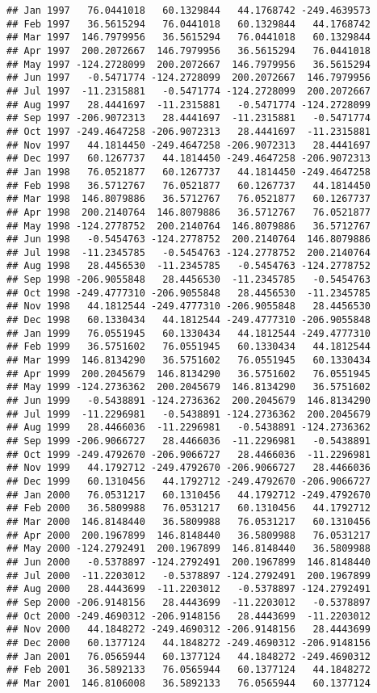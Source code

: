 \documentclass[]{article}
\begin{document}
\begin{verbatim}
## Jan 1997   76.0441018   60.1329844   44.1768742 -249.4639573
## Feb 1997   36.5615294   76.0441018   60.1329844   44.1768742
## Mar 1997  146.7979956   36.5615294   76.0441018   60.1329844
## Apr 1997  200.2072667  146.7979956   36.5615294   76.0441018
## May 1997 -124.2728099  200.2072667  146.7979956   36.5615294
## Jun 1997   -0.5471774 -124.2728099  200.2072667  146.7979956
## Jul 1997  -11.2315881   -0.5471774 -124.2728099  200.2072667
## Aug 1997   28.4441697  -11.2315881   -0.5471774 -124.2728099
## Sep 1997 -206.9072313   28.4441697  -11.2315881   -0.5471774
## Oct 1997 -249.4647258 -206.9072313   28.4441697  -11.2315881
## Nov 1997   44.1814450 -249.4647258 -206.9072313   28.4441697
## Dec 1997   60.1267737   44.1814450 -249.4647258 -206.9072313
## Jan 1998   76.0521877   60.1267737   44.1814450 -249.4647258
## Feb 1998   36.5712767   76.0521877   60.1267737   44.1814450
## Mar 1998  146.8079886   36.5712767   76.0521877   60.1267737
## Apr 1998  200.2140764  146.8079886   36.5712767   76.0521877
## May 1998 -124.2778752  200.2140764  146.8079886   36.5712767
## Jun 1998   -0.5454763 -124.2778752  200.2140764  146.8079886
## Jul 1998  -11.2345785   -0.5454763 -124.2778752  200.2140764
## Aug 1998   28.4456530  -11.2345785   -0.5454763 -124.2778752
## Sep 1998 -206.9055848   28.4456530  -11.2345785   -0.5454763
## Oct 1998 -249.4777310 -206.9055848   28.4456530  -11.2345785
## Nov 1998   44.1812544 -249.4777310 -206.9055848   28.4456530
## Dec 1998   60.1330434   44.1812544 -249.4777310 -206.9055848
## Jan 1999   76.0551945   60.1330434   44.1812544 -249.4777310
## Feb 1999   36.5751602   76.0551945   60.1330434   44.1812544
## Mar 1999  146.8134290   36.5751602   76.0551945   60.1330434
## Apr 1999  200.2045679  146.8134290   36.5751602   76.0551945
## May 1999 -124.2736362  200.2045679  146.8134290   36.5751602
## Jun 1999   -0.5438891 -124.2736362  200.2045679  146.8134290
## Jul 1999  -11.2296981   -0.5438891 -124.2736362  200.2045679
## Aug 1999   28.4466036  -11.2296981   -0.5438891 -124.2736362
## Sep 1999 -206.9066727   28.4466036  -11.2296981   -0.5438891
## Oct 1999 -249.4792670 -206.9066727   28.4466036  -11.2296981
## Nov 1999   44.1792712 -249.4792670 -206.9066727   28.4466036
## Dec 1999   60.1310456   44.1792712 -249.4792670 -206.9066727
## Jan 2000   76.0531217   60.1310456   44.1792712 -249.4792670
## Feb 2000   36.5809988   76.0531217   60.1310456   44.1792712
## Mar 2000  146.8148440   36.5809988   76.0531217   60.1310456
## Apr 2000  200.1967899  146.8148440   36.5809988   76.0531217
## May 2000 -124.2792491  200.1967899  146.8148440   36.5809988
## Jun 2000   -0.5378897 -124.2792491  200.1967899  146.8148440
## Jul 2000  -11.2203012   -0.5378897 -124.2792491  200.1967899
## Aug 2000   28.4443699  -11.2203012   -0.5378897 -124.2792491
## Sep 2000 -206.9148156   28.4443699  -11.2203012   -0.5378897
## Oct 2000 -249.4690312 -206.9148156   28.4443699  -11.2203012
## Nov 2000   44.1848272 -249.4690312 -206.9148156   28.4443699
## Dec 2000   60.1377124   44.1848272 -249.4690312 -206.9148156
## Jan 2001   76.0565944   60.1377124   44.1848272 -249.4690312
## Feb 2001   36.5892133   76.0565944   60.1377124   44.1848272
## Mar 2001  146.8106008   36.5892133   76.0565944   60.1377124
\end{verbatim}
\end{document}
